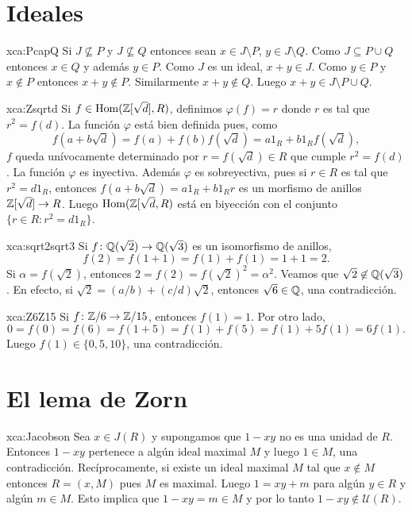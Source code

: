 \section*{Ideales}

\begin{sol}{xca:PcapQ} 
	Si $J\not\subseteq P$ y $J\not\subseteq Q$ entonces sean
	$x\in J\setminus P$, $y\in J\setminus Q$. Como $J\subseteq P\cup Q$
	entonces $x\in Q$ y además $y\in P$. Como $J$ es un ideal, $x+y\in J$. Como
	$y\in P$ y $x\not\in P$ entonces $x+y\not\in P$. Similarmente $x+y\not\in
	Q$.  Luego $x+y\in J\setminus P\cup Q$.
\end{sol}

\begin{sol}{xca:Zsqrtd}
Si $f\in\operatorname{Hom}(\mathbb{Z}[\sqrt{d}],R)$, definimos $\varphi(f)=r$ donde $r$ es tal que 
$r^2=f(d)$. La función $\varphi$ está bien definida pues, como 
\[
f(a+b\sqrt{d})=f(a)+f(b)f(\sqrt{d})=a1_R+b1_Rf(\sqrt{d}),
\]
$f$ queda unívocamente determinado por $r=f(\sqrt{d})\in R$
que cumple $r^2=f(d)$. La función $\varphi$ es inyectiva. Además $\varphi$ es sobreyectiva, pues
si $r\in R$ es tal que $r^2=d1_R$, entonces 
$f(a+b\sqrt{d})=a1_R+b1_Rr$ es un morfismo de anillos $\mathbb{Z}[\sqrt{d}]\to R$. 
Luego $\operatorname{Hom}(\mathbb{Z}[\sqrt{d},R)$ está en biyección con 
el conjunto $\{r\in R:r^2=d1_R\}$. 
\end{sol}

\begin{sol}{xca:sqrt2sqrt3}
 Si $f\colon\mathbb{Q}(\sqrt{2})\to\mathbb{Q}(\sqrt{3})$ es un isomorfismo de anillos,
 \[
 f(2)=f(1+1)=f(1)+f(1)=1+1=2.
 \] 
 Si $\alpha=f(\sqrt{2})$, entonces $2=f(2)=f(\sqrt{2})^2=\alpha^2$. Veamos
 que $\sqrt{2}\not\in\mathbb{Q}(\sqrt{3})$. En efecto, si $\sqrt{2}=(a/b)+(c/d)\sqrt{2}$, entonces
 $\sqrt{6}\in\mathbb{Q}$, una contradicción.
\end{sol}

\begin{sol}{xca:Z6Z15}
 Si $f\colon\mathbb{Z}/6\to\mathbb{Z}/15$, entonces $f(1)=1$. Por otro lado,
 \[
 0=f(0)=f(6)=f(1+5)=f(1)+f(5)=f(1)+5f(1)=6f(1).
 \]
 Luego $f(1)\in\{0,5,10\}$, una contradicción.
\end{sol}

\section*{El lema de Zorn}

\begin{sol}{xca:Jacobson}
    Sea $x\in J(R)$ y supongamos que $1-xy$ no
    es una unidad de $R$. Entonces $1-xy$ pertenece a algún ideal maximal $M$ y
    luego $1\in M$, una contradicción. Recíprocamente, si existe
    un ideal maximal $M$ tal que $x\not\in M$ entonces $R=(x,M)$ pues $M$ es
    maximal. Luego $1=xy+m$ para algún $y\in R$ y algún $m\in M$. Esto implica que
    $1-xy=m\in M$ y por lo tanto $1-xy\not\in\mathcal{U}(R)$. 
\end{sol}


